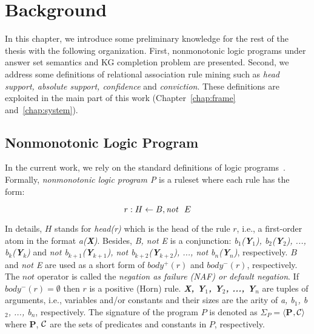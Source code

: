 \chapter{Background}
\label{chap:back}

In this chapter, we introduce some preliminary knowledge for the rest of the thesis with the following organization. First, nonmonotonic logic programs under answer set semantics and KG completion problem are presented. Second, we address some definitions of relational association rule mining such as \textit{head support, absolute support, confidence} and \textit{conviction}. These definitions are exploited in the main part of this work (Chapter~\ref{chap:frame} and~\ref{chap:system}).

\section{Nonmonotonic Logic Program}

In the current work, we rely on the standard definitions of logic programs~\cite{ref49}. Formally, \textit{nonmonotonic logic program P} is a ruleset where each rule has the form:

\begin{equation}
r: H \leftarrow B, \mathit{not}~ \ E
\end{equation}
\label{rule3}

In details, $H$ stands for \textit{head(r)} which is the head of the rule $r$, i.e., a first-order atom in the format \textit{a(\textbf{X})}. Besides, \textit{B, not E} is a conjunction: \textit{b$_1$(\textbf{Y}$_1$), b$_2$(\textbf{Y}$_2$), ..., b$_k$(\textbf{Y}$_k$)} and \textit{not b$_{k+1}$(\textbf{Y}$_{k+1}$), not b$_{k+2}$(\textbf{Y}$_{k+2}$), ..., not b$_n$(\textbf{Y}$_n$)}, respectively. $B$ and \textit{not E} are used as a short form of $body^+(r)$ and $body^-(r)$, respectively. The $not$ operator is called the \textit{negation as failure (NAF) or default negation}. If $body^-(r) = \emptyset$ then $r$ is a positive (Horn) rule. \textit{\textbf{X, Y$_{1}$, Y$_{2}$, ..., Y$_{n}$}} are tuples of arguments, i.e., variables and/or constants and their sizes are the arity of \textit{a, b$_1$, b$_2$, ..., b$_n$}, respectively. The signature of the program $P$ is denoted as $\Sigma_{P} = \langle$\textbf{P}$, \mathcal{C}\rangle$ where \textbf{P}, $\mathcal{C}$ are the sets of predicates and constants in $P$, respectively.

